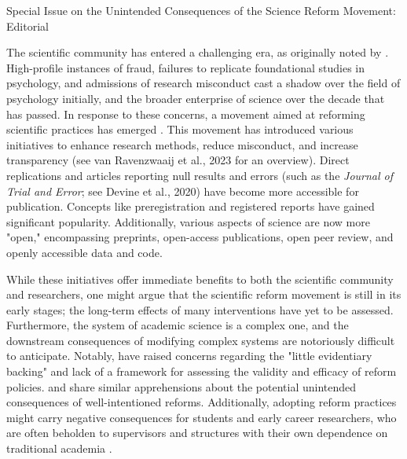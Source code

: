 \documentclass[authordate, editorial,noabstract]{jote-new-article}
\author[1]{\mbox{Sarahanne Field\orcid{0000-0001-7874-1261}}}
\affil[1]{University of Groningen}
\author[2]{\mbox{Noah van Dongen\orcid{0000-0003-0387-7388}}}
\affil[2]{University of Amsterdam}
\author[3]{\mbox{Leonid Tiokhin\orcid{0000-0001-7333-0383}}}
\affil[3]{IG\&H: Utrecht}
\begin{document}
\begin{frontmatter}
  \maketitle
  \begin{abstract}
    \printabstracttext
  \end{abstract}
\end{frontmatter}


Special Issue on the Unintended Consequences of the Science Reform Movement: Editorial










The scientific community has entered a challenging era, as originally noted by \textcite{Wagenmakers2012}. High-profile instances of fraud, failures to replicate foundational studies in psychology, and admissions of research misconduct \parencites[e.g.,][]{John2012} cast a shadow over the field of psychology initially, and the broader enterprise of science over the decade that has passed. In response to these concerns, a movement aimed at reforming scientific practices has emerged \parencites{Field2022}{Munafo2017}{Spellman2018}. This movement has introduced various initiatives to enhance research methods, reduce misconduct, and increase transparency (see van Ravenzwaaij et al., 2023 for an overview). Direct replications and articles reporting null results and errors (such as the\emph{ Journal of Trial and Error}; see Devine et al., 2020) have become more accessible for publication. Concepts like preregistration and registered reports have gained significant popularity. Additionally, various aspects of science are now more "open," encompassing preprints, open-access publications, open peer review, and openly accessible data and code.



While these initiatives offer immediate benefits to both the scientific community and researchers, one might argue that the scientific reform movement is still in its early stages; the long-term effects of many interventions have yet to be assessed. Furthermore, the system of academic science is a complex one, and the downstream consequences of modifying complex systems are notoriously difficult to anticipate. Notably, \textcite{Devezer2021} have raised concerns regarding the "little evidentiary backing" and lack of a framework for assessing the validity and efficacy of reform policies. \textcite{Ioannidis2014} and \textcite{Tiokhin2021} share similar apprehensions about the potential unintended consequences of well-intentioned reforms. Additionally, adopting reform practices might carry negative consequences for students and early career researchers, who are often beholden to supervisors and structures with their own dependence on traditional academia \parencites{Field2023}.
\end{document}
